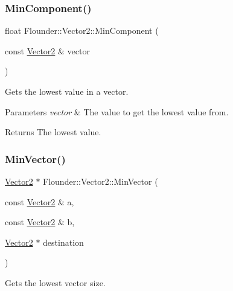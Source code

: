 \subsubsection{\texorpdfstring{Min\+Component()}{MinComponent()}}
{\footnotesize\ttfamily float Flounder\+::\+Vector2\+::\+Min\+Component (\begin{DoxyParamCaption}\item[{const \hyperlink{class_flounder_1_1_vector2}{Vector2} \&}]{vector }\end{DoxyParamCaption})\hspace{0.3cm}{\ttfamily [static]}}



Gets the lowest value in a vector. 


\begin{DoxyParams}{Parameters}
{\em vector} & The value to get the lowest value from. \\
\hline
\end{DoxyParams}
\begin{DoxyReturn}{Returns}
The lowest value. 
\end{DoxyReturn}
\mbox{\label{class_flounder_1_1_vector2_ad3ad00234085adc307188a85fc7cbad0}} 
\subsubsection{\texorpdfstring{Min\+Vector()}{MinVector()}}
{\footnotesize\ttfamily \hyperlink{class_flounder_1_1_vector2}{Vector2} $\ast$ Flounder\+::\+Vector2\+::\+Min\+Vector (\begin{DoxyParamCaption}\item[{const \hyperlink{class_flounder_1_1_vector2}{Vector2} \&}]{a,  }\item[{const \hyperlink{class_flounder_1_1_vector2}{Vector2} \&}]{b,  }\item[{\hyperlink{class_flounder_1_1_vector2}{Vector2} $\ast$}]{destination }\end{DoxyParamCaption})\hspace{0.3cm}{\ttfamily [static]}}



Gets the lowest vector size. 


